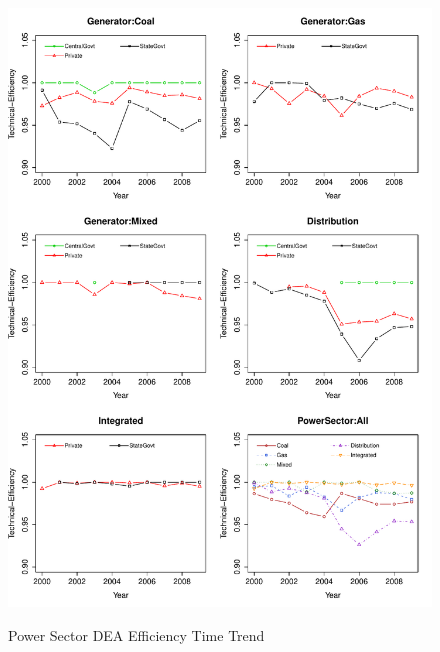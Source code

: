
\begin{figure}[ht]
	\centering
	\caption{Power Sector DEA Efficiency Time Trend}
		\includegraphics[width=1.00\textwidth]{chapter03/DEATimeTrend.pdf}
		\label{fig:DEATimeTrend}
\end{figure}

